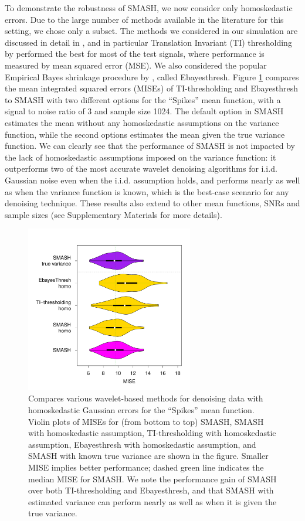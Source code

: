 \documentclass[12pt]{article}
\begin{document}
To demonstrate the robustness of SMASH, we now consider only homoskedastic errors. Due to the large number of methods available in the literature for this setting, we chose only a subset. The methods we considered in our simulation are discussed in detail in \cite{Antoniadis2001Wavelet}, and in particular Translation Invariant (TI) thresholding by \cite{Coifman1995Translationinvariant} performed the best for most of the test signals, where performance is measured by mean squared error (MSE). We also considered the popular Empirical Bayes shrinkage procedure by \cite{Johnstone2005Empirical}, called Ebayesthresh. Figure \ref{fig:gaus_homo} compares the mean integrated squared errors (MISEs) of TI-thresholding and Ebayesthresh to SMASH with two different options for the ``Spikes'' mean function, with a signal to noise ratio of 3 and sample size 1024. The default option in SMASH estimates the mean without any homoskedastic assumptions on the variance function, while the second options estimates the mean given the true variance function. We can clearly see that the performance of SMASH is not impacted by the lack of homoskedastic assumptions imposed on the variance function: it outperforms two of the most accurate wavelet denoising algorithms for i.i.d. Gaussian noise even when the i.i.d. assumption holds, and performs nearly as well as when the variance function is known, which is the best-case scenario for any denoising technique. These results also extend to other mean functions, SNRs and sample sizes (see Supplementary Materials for more details).

\begin{figure}
\centering
    \includegraphics[width=0.65\textwidth]{violin_gaus_homo.pdf}
    \caption{Compares various wavelet-based methods for denoising data with homoskedastic Gaussian errors for the ``Spikes'' mean function. Violin plots of MISEs for (from bottom to top) SMASH, SMASH with homoskedastic assumption, TI-thresholding with homoskedastic assumption, Ebayesthresh with homoskedastic assumption, and SMASH with known true variance are shown in the figure. Smaller MISE implies better performance; dashed green line indicates the median MISE for SMASH. We note the performance gain of SMASH over both TI-thresholding and Ebayesthresh, and that SMASH with estimated variance can perform nearly as well as when it is given the true variance.}
    \label{fig:gaus_homo}
\end{figure}
\end{document}
